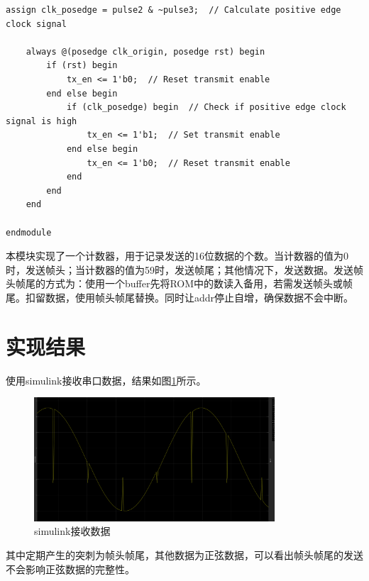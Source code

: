 \documentclass[UTF8]{ctexart}
\begin{document}
\begin{framed}
\begin{lstlisting}[style=verilogStyle]
    assign clk_posedge = pulse2 & ~pulse3;  // Calculate positive edge clock signal

    always @(posedge clk_origin, posedge rst) begin
        if (rst) begin
            tx_en <= 1'b0;  // Reset transmit enable
        end else begin
            if (clk_posedge) begin  // Check if positive edge clock signal is high
                tx_en <= 1'b1;  // Set transmit enable
            end else begin
                tx_en <= 1'b0;  // Reset transmit enable
            end
        end
    end

endmodule
    \end{lstlisting}
\end{framed}
本模块实现了一个计数器，用于记录发送的16位数据的个数。当计数器的值为0时，发送帧头；当计数器的值为59时，发送帧尾；其他情况下，发送数据。发送帧头帧尾的方式为：使用一个buffer先将ROM中的数读入备用，若需发送帧头或帧尾。扣留数据，使用帧头帧尾替换。同时让addr停止自增，确保数据不会中断。

\section{实现结果}
使用simulink接收串口数据，结果如图\ref{fig:simulink}所示。
\begin{figure}[!ht]
    \centering
    \includegraphics[width=0.8\textwidth]{simulink.png}
    \caption{simulink接收数据}
    \label{fig:simulink}
\end{figure}

其中定期产生的突刺为帧头帧尾，其他数据为正弦数据，可以看出帧头帧尾的发送不会影响正弦数据的完整性。
\end{document}
